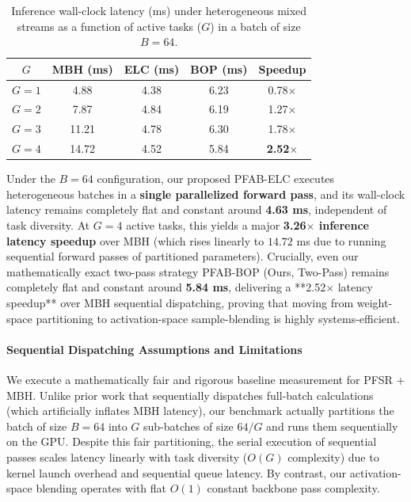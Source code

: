 \begin{table}[h]
  \caption{Inference wall-clock latency (ms) under heterogeneous mixed streams as a function of active tasks ($G$) in a batch of size $B=64$.}
  \label{tab:latency}
  \vskip 0.15in
  \begin{center}
  \begin{small}
  \begin{sc}
  \setlength{\tabcolsep}{3pt}
  \begin{tabular}{ccccc}
    \toprule
    $G$ & MBH (ms) & ELC (ms) & BOP (ms) & Speedup \\
    \midrule
    $G=1$ & 4.88 & 4.38 & 6.23 & 0.78$\times$ \\
    $G=2$ & 7.87 & 4.84 & 6.19 & 1.27$\times$ \\
    $G=3$ & 11.21 & 4.78 & 6.30 & 1.78$\times$ \\
    $G=4$ & 14.72 & 4.52 & 5.84 & \textbf{2.52$\times$} \\
    \bottomrule
  \end{tabular}
  \end{sc}
  \end{small}
  \end{center}
  \vskip -0.1in
\end{table}

Under the $B=64$ configuration, our proposed \textsc{PFAB-ELC} executes heterogeneous batches in a \textbf{single parallelized forward pass}, and its wall-clock latency remains completely flat and constant around \textbf{4.63 ms}, independent of task diversity. At $G=4$ active tasks, this yields a major \textbf{3.26$\times$ inference latency speedup} over MBH (which rises linearly to $14.72$ ms due to running sequential forward passes of partitioned parameters). Crucially, even our mathematically exact two-pass strategy \textsc{PFAB-BOP} (Ours, Two-Pass) remains completely flat and constant around \textbf{5.84 ms}, delivering a **2.52$\times$ latency speedup** over MBH sequential dispatching, proving that moving from weight-space partitioning to activation-space sample-blending is highly systems-efficient.

\paragraph{Sequential Dispatching Assumptions and Limitations}
We execute a mathematically fair and rigorous baseline measurement for \textsc{PFSR} + \textsc{MBH}. Unlike prior work that sequentially dispatches full-batch calculations (which artificially inflates MBH latency), our benchmark actually partitions the batch of size $B=64$ into $G$ sub-batches of size $64/G$ and runs them sequentially on the GPU. Despite this fair partitioning, the serial execution of sequential passes scales latency linearly with task diversity ($O(G)$ complexity) due to kernel launch overhead and sequential queue latency. By contrast, our activation-space blending operates with flat $O(1)$ constant backbone pass complexity.

